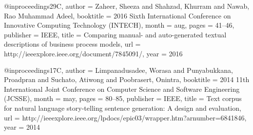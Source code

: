 @inproceedings{29C,
author = {Zaheer, Sheeza and Shahzad, Khurram and Nawab, Rao Muhammad Adeel},
booktitle = {2016 Sixth International Conference on Innovative Computing Technology (INTECH)},
month = {aug},
pages = {41--46},
publisher = {IEEE},
title = {Comparing manual- and auto-generated textual descriptions of business process models},
url = {http://ieeexplore.ieee.org/document/7845091/},
year = {2016}
}

@inproceedings{17C,
author = {Limpanadusadee, Worasa and Punyabukkana, Proadpran and Suchato, Atiwong and Poobrasert, Onintra},
booktitle = {2014 11th International Joint Conference on Computer Science and Software Engineering (JCSSE)},
month = {may},
pages = {80--85},
publisher = {IEEE},
title = {Text corpus for natural language story-telling sentence generation: A design and evaluation},
url = {http://ieeexplore.ieee.org/lpdocs/epic03/wrapper.htm?arnumber=6841846},
year = {2014}
}